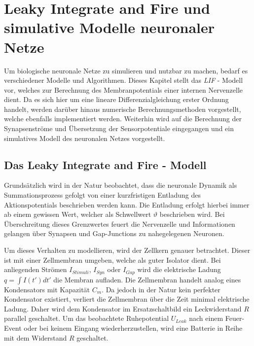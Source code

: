 %
\chapter{Leaky Integrate and Fire und simulative Modelle neuronaler Netze}
\label{chap:lif}
%

	Um biologische neuronale Netze zu simulieren und nutzbar zu machen, bedarf es verschiedener Modelle und Algorithmen. Dieses Kapitel stellt das \textit{LIF} - Modell vor, welches zur Berechnung des Membranpotentials einer internen Nervenzelle dient. Da es sich hier um eine lineare Differenzialgleichung erster Ordnung handelt, werden darüber hinaus numerische Berechnungsmethoden vorgestellt, welche ebenfalls implementiert werden. Weiterhin wird auf die Berechnung der Synapsenströme und Übersetzung der Sensorpotentiale eingegangen und ein simulatives Modell des neuronalen Netzes vorgestellt.

\section{Das Leaky Integrate and Fire - Modell}
\label{sec:lif_model}
	Grundsätzlich wird in der Natur beobachtet, dass die neuronale Dynamik als Summationsprozess gefolgt von einer kurzfristigen Entladung des Aktionspotentials beschrieben werden kann. Die Entladung erfolgt hierbei immer ab einem gewissen Wert, welcher als Schwellwert $\vartheta$ beschrieben wird. Bei Überschreitung dieses Grenzwertes \glqq feuert\grqq{} die Nervenzelle und Informationen gelangen über Synapsen und Gap-Junctions zu nahegelegenen Neuronen.
	
	Um dieses Verhalten zu modellieren, wird der Zellkern genauer betrachtet. Dieser ist mit einer Zellmembran umgeben, welche als guter Isolator dient. Bei anliegenden Strömen $I_{Stimuli}$, $I_{Syn}$ oder $I_{Gap}$ wird die elektrische Ladung $q = \int I(t')dt'$ die Membran aufladen. Die Zellmembran handelt analog eines Kondensators mit Kapazität $C_m$. Da jedoch in der Natur kein perfekter Kondensator existiert, verliert die Zellmembran über die Zeit minimal elektrische Ladung. Daher wird dem Kondensator im Ersatzschaltbild ein Leckwiderstand $R$ parallel geschaltet. Um das beobachtete Ruhepotential $U_{Leak}$ nach einem Feuer-Event oder bei keinem Eingang wiederherzustellen, wird eine Batterie in Reihe mit dem Widerstand $R$ geschaltet.
	
